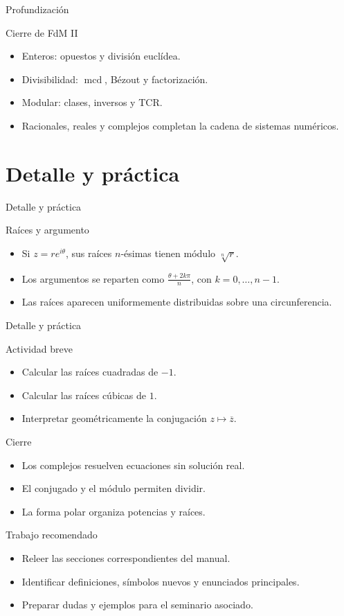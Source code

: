 \documentclass[aspectratio=169,11pt]{beamer}
\newcommand{\mcd}{\operatorname{mcd}}
\begin{document}
\begin{frame}{Profundización}
\begin{block}{Cierre de FdM II}
\begin{itemize}
  \item Enteros: opuestos y división euclídea.
  \item Divisibilidad: \(\mcd\), Bézout y factorización.
  \item Modular: clases, inversos y TCR.
  \item Racionales, reales y complejos completan la cadena de sistemas numéricos.
\end{itemize}
\end{block}
\end{frame}


\section{Detalle y práctica}

\begin{frame}{Detalle y práctica}
\begin{block}{Raíces y argumento}
\begin{itemize}
  \item Si \(z=re^{i\theta}\), sus raíces \(n\)-ésimas tienen módulo \(\sqrt[n]{r}\).
  \item Los argumentos se reparten como \(\frac{\theta+2k\pi}{n}\), con \(k=0,\ldots,n-1\).
  \item Las raíces aparecen uniformemente distribuidas sobre una circunferencia.
\end{itemize}
\end{block}
\end{frame}

\begin{frame}{Detalle y práctica}
\begin{block}{Actividad breve}
\begin{itemize}
  \item Calcular las raíces cuadradas de \(-1\).
  \item Calcular las raíces cúbicas de \(1\).
  \item Interpretar geométricamente la conjugación \(z\mapsto \overline{z}\).
\end{itemize}
\end{block}
\end{frame}

\begin{frame}{Cierre}
\begin{itemize}
  \item Los complejos resuelven ecuaciones sin solución real.
  \item El conjugado y el módulo permiten dividir.
  \item La forma polar organiza potencias y raíces.
\end{itemize}
\end{frame}

\begin{frame}{Trabajo recomendado}
\begin{itemize}
  \item Releer las secciones correspondientes del manual.
  \item Identificar definiciones, símbolos nuevos y enunciados principales.
  \item Preparar dudas y ejemplos para el seminario asociado.
\end{itemize}
\end{frame}
\end{document}
